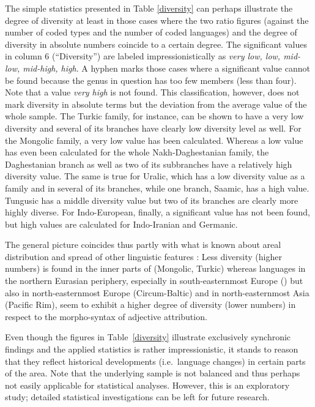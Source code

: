 The simple statistics presented in Table \ref{diversity} can perhaps illustrate the degree of diversity at least in those cases where the two ratio figures (against the number of coded types and the number of coded languages) and the degree of diversity in absolute numbers coincide to a certain degree. The significant values in column 6 (“Diversity”) are labeled impressionistically as \textit{very low, low, mid-low, mid-high, high}. A hyphen marks those cases where a significant value cannot be found because the genus in question has too few members (less than four). Note that a value \textit{very high} is not found. This classification, however, does not mark diversity in absolute terms but the deviation from the average value of the whole sample. The Turkic family, for instance, can be shown to have a very low diversity and several of its branches have clearly low diversity level as well. For the Mongolic family, a very low value has been calculated. Whereas a low value has even been calculated for the whole Nakh-Daghestanian family, the Daghestanian branch as well as two of its subbranches have a relatively high diversity value. The same is true for Uralic, which has a low diversity value as a family and in several of its branches, while one branch, Saamic, has a high value. Tungusic has a middle diversity value but two of its branches are clearly more highly diverse. For Indo-European, finally, a significant value has not been found, but high values are calculated for Indo-Iranian and Germanic.

The general picture coincides thus partly with what is known about areal distribution and spread of other linguistic features \citep[cf., e.g.,][]{nichols1992}: Less diversity (higher numbers) is found in the inner parts of  (Mongolic, Turkic) whereas languages in the northern Eurasian periphery, especially in south-easternmost Europe () but also in north-easternmost Europe (Circum-Baltic) and in north-easternmost Asia (Pacific Rim), seem to exhibit a higher degree of diversity (lower numbers) in respect to the morpho-syntax of adjective attribution.

Even though the figures in Table~\ref{diversity} illustrate exclusively synchronic findings and the applied statistics is rather impressionistic, it stands to reason that they reflect historical developments (i.e.~language changes) in certain parts of the area. Note that the underlying sample is not balanced and thus perhaps not easily applicable for statistical analyses. However, this is an exploratory study; detailed statistical investigations can be left for future research.

